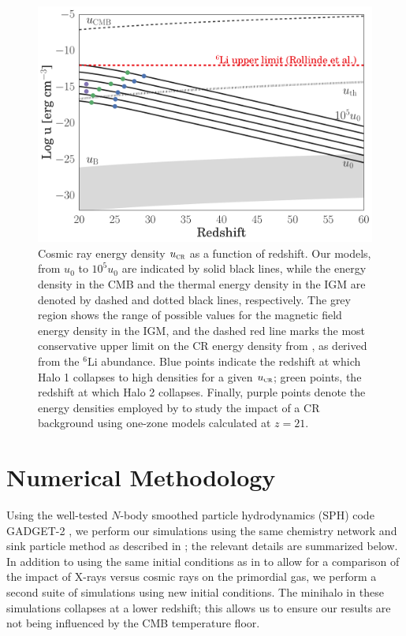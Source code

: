 \documentclass{thesis}
\newcommand{\ucr}{\ensuremath{{u}_{\textsc{cr}}}\xspace}
\begin{document}
\begin{figure}
\begin{center}
\includegraphics[width=1\columnwidth]{figures/u_cr/u_cr}
\caption{\label{fig:ucr}
Cosmic ray energy density $\ucr$ as a function of redshift.  
Our models, from $u_0$ to $10^5u_0$ are indicated by solid black lines, while the energy density in the CMB and the thermal energy density in the IGM are denoted by dashed and dotted black lines, respectively. 
The grey region shows the range of possible values for the magnetic field energy density in the IGM, and the dashed red line marks the most conservative upper limit on the CR energy density from \citet{RollindeVangioniOlive2006}, as derived from the $^6$Li abundance. 
Blue points indicate the redshift at which Halo 1 collapses to high densities for a given $\ucr$; green points, the redshift at which Halo 2 collapses.  
Finally, purple points denote the energy densities employed by \citet{StacyBromm2007} to study the impact of a CR background using one-zone models calculated at $z=21$.%
}
\end{center}
\end{figure}

\section{Numerical Methodology}
\label{sec:methods}
Using the well-tested $N$-body smoothed particle hydrodynamics (SPH) code GADGET-2 \citep{Springel2005}, we perform our simulations using the same chemistry network and sink particle method as described in \citet{Hummeletal2015}; the relevant details are summarized below.  
In addition to using the same initial conditions as in \citet{Hummeletal2015} to allow for a comparison of the impact of X-rays versus cosmic rays on the primordial gas, we perform a second suite of simulations using new initial conditions.  
The minihalo in these simulations collapses at a lower redshift; this allows us to ensure our results are not being influenced by the CMB temperature floor.
\end{document}
